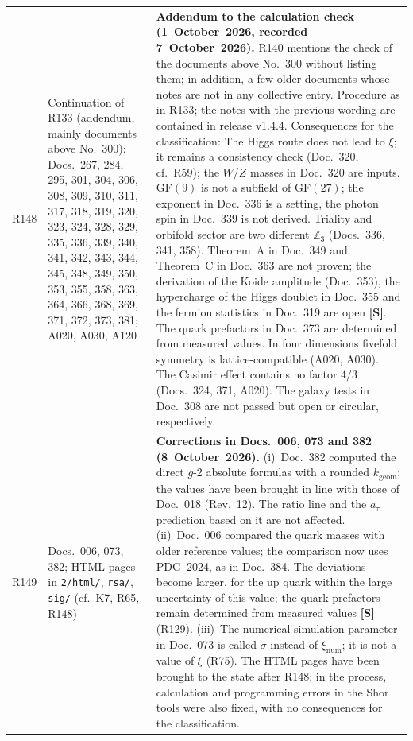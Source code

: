 \begin{longtable}{@{}p{0.9cm}p{3.1cm}p{10.2cm}@{}}
R148 & Continuation of R133 (addendum, mainly documents above No.~300): Docs.~267, 284, 295, 301, 304, 306, 308, 309, 310, 311, 317, 318, 319, 320, 323, 324, 328, 329, 335, 336, 339, 340, 341, 342, 343, 344, 345, 348, 349, 350, 353, 355, 358, 363, 364, 366, 368, 369, 371, 372, 373, 381; A020, A030, A120 & \textbf{Addendum to the calculation check (1~October~2026, recorded 7~October~2026).} R140 mentions the check of the documents above No.~300 without listing them; in addition, a few older documents whose notes are not in any collective entry. Procedure as in R133; the notes with the previous wording are contained in release v1.4.4. Consequences for the classification: The Higgs route does not lead to $\xi$; it remains a consistency check (Doc.~320, cf.\ R59); the $W$/$Z$ masses in Doc.~320 are inputs. GF$(9)$ is not a subfield of GF$(27)$; the exponent in Doc.~336 is a setting, the photon spin in Doc.~339 is not derived. Triality and orbifold sector are two different $\mathbb{Z}_3$ (Docs.~336, 341, 358). Theorem~A in Doc.~349 and Theorem~C in Doc.~363 are not proven; the derivation of the Koide amplitude (Doc.~353), the hypercharge of the Higgs doublet in Doc.~355 and the fermion statistics in Doc.~319 are open \textbf{[S]}. The quark prefactors in Doc.~373 are determined from measured values. In four dimensions fivefold symmetry is lattice-compatible (A020, A030). The Casimir effect contains no factor $4/3$ (Docs.~324, 371, A020). The galaxy tests in Doc.~308 are not passed but open or circular, respectively. \\
R149 & Docs.~006, 073, 382; HTML pages in \texttt{2/html/}, \texttt{rsa/}, \texttt{sig/} (cf.\ K7, R65, R148) & \textbf{Corrections in Docs.~006, 073 and 382 (8~October~2026).} (i)~Doc.~382 computed the direct $g$-2 absolute formulas with a rounded $k_{\mathrm{geom}}$; the values have been brought in line with those of Doc.~018 (Rev.~12). The ratio line and the $a_\tau$ prediction based on it are not affected. (ii)~Doc.~006 compared the quark masses with older reference values; the comparison now uses PDG~2024, as in Doc.~384. The deviations become larger, for the up quark within the large uncertainty of this value; the quark prefactors remain determined from measured values \textbf{[S]} (R129). (iii)~The numerical simulation parameter in Doc.~073 is called $\sigma$ instead of $\xi_{\mathrm{num}}$; it is not a value of $\xi$ (R75). The HTML pages have been brought to the state after R148; in the process, calculation and programming errors in the Shor tools were also fixed, with no consequences for the classification. \\

\end{longtable}
